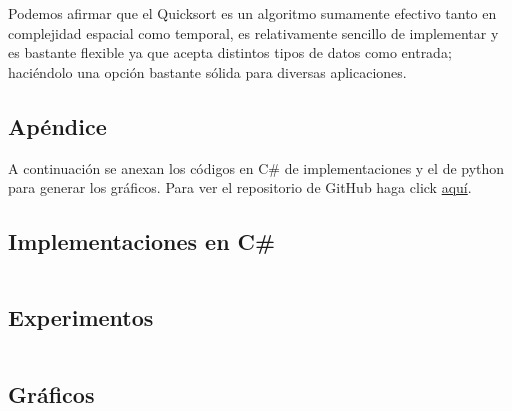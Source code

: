 \documentclass[conference]{IEEEtran}
\begin{document}
Podemos afirmar que el Quicksort es un algoritmo sumamente efectivo tanto en complejidad espacial como temporal, es relativamente sencillo de implementar y es bastante flexible ya que acepta distintos tipos de datos como entrada; haciéndolo una opción bastante sólida para diversas aplicaciones.




\begin{@twocolumnfalse}

\section{Apéndice}
A continuación se anexan los códigos en C\# de implementaciones y el de python para generar los gráficos. Para ver el repositorio de GitHub haga click \href{https://github.com/PabloNatB/Quicksort}{aquí}.

\subsection{Implementaciones en C\#}
\inputminted[breaklines=true]{csharp}{Qsort/Class1.cs}

\subsection{Experimentos}
\inputminted[breaklines=true]{csharp}{Qsort/Program.cs}

\subsection{Gráficos}
\inputminted[breaklines=true]{python}{graphs.py}
\end{@twocolumnfalse}
\end{document}
